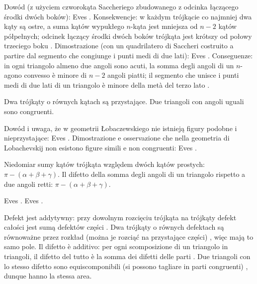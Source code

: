Dowód (z użyciem czworokąta Saccheriego zbudowanego z odcinka łączącego środki dwóch boków): Eves \cite[s. 299--300]{eves1_1972}. %
Konsekwencje: w każdym trójkącie co najmniej dwa kąty są ostre, a suma kątów wypukłego $n$-kąta jest mniejsza od $n - 2$ kątów półpełnych; odcinek łączący środki dwóch boków trójkąta jest krótszy od połowy trzeciego boku \cite[s. 301, 304]{eves1_1972}. %
Dimostrazione (con un quadrilatero di Saccheri costruito a partire dal segmento che congiunge i punti medi di due lati): Eves \cite[p. 299--300]{eves1_1972}. %
Conseguenze: in ogni triangolo almeno due angoli sono acuti, la somma degli angoli di un $n$-agono convesso è minore di $n - 2$ angoli piatti; il segmento che unisce i punti medi di due lati di un triangolo è minore della metà del terzo lato \cite[p. 301, 304]{eves1_1972}. %

\begin{theorem}
	Dwa trójkąty o równych kątach są przystające. %
	Due triangoli con angoli uguali sono congruenti. %
\end{theorem}

Dowód i uwaga, że w geometrii Łobaczewskiego nie istnieją figury podobne i nieprzystające: Eves \cite[s. 300--301]{eves1_1972}. %
Dimostrazione e osservazione che nella geometria di Lobachevskij non esistono figure simili e non congruenti: Eves \cite[p. 300--301]{eves1_1972}. %

\begin{definition}
[defekt trójkąta] %
[difetto di un triangolo] %
	Niedomiar sumy kątów trójkąta względem dwóch kątów prostych: $\pi - (\alpha + \beta + \gamma)$. %
	Il difetto della somma degli angoli di un triangolo rispetto a due angoli retti: $\pi - (\alpha + \beta + \gamma)$. %
\end{definition}

Eves \cite[s. 300]{eves1_1972}. %
Eves \cite[p. 300]{eves1_1972}. %

Defekt jest addytywny: przy dowolnym rozcięciu trójkąta na trójkąty defekt całości jest sumą defektów części \cite[s. 301--302]{eves1_1972}. %
Dwa trójkąty o równych defektach są równoważne przez rozkład (można je rozciąć na przystające części) \cite[s. 302--304]{eves1_1972}, więc mają to samo pole. %
Il difetto è additivo: per ogni scomposizione di un triangolo in triangoli, il difetto del tutto è la somma dei difetti delle parti \cite[p. 301--302]{eves1_1972}. %
Due triangoli con lo stesso difetto sono equiscomponibili (si possono tagliare in parti congruenti) \cite[p. 302--304]{eves1_1972}, dunque hanno la stessa area. %

